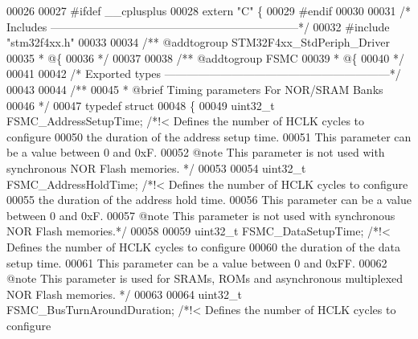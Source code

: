 \begin{DoxyCode}
00026 
00027 \textcolor{preprocessor}{#}\textcolor{preprocessor}{ifdef} \_\_cplusplus
00028  \textcolor{keyword}{extern} \textcolor{stringliteral}{"C"} \{
00029 \textcolor{preprocessor}{#}\textcolor{preprocessor}{endif}
00030 
00031 \textcolor{comment}{/* Includes ------------------------------------------------------------------*/}
00032 \textcolor{preprocessor}{#}\textcolor{preprocessor}{include} "stm32f4xx.h"
00033 
00034 \textcolor{comment}{/** @addtogroup STM32F4xx\_StdPeriph\_Driver}
00035 \textcolor{comment}{  * @\{}
00036 \textcolor{comment}{  */}
00037 
00038 \textcolor{comment}{/** @addtogroup FSMC}
00039 \textcolor{comment}{  * @\{}
00040 \textcolor{comment}{  */}
00041 
00042 \textcolor{comment}{/* Exported types ------------------------------------------------------------*/}
00043 
00044 \textcolor{comment}{/** }
00045 \textcolor{comment}{  * @brief  Timing parameters For NOR/SRAM Banks  }
00046 \textcolor{comment}{  */}
00047 \textcolor{keyword}{typedef} \textcolor{keyword}{struct}
00048 \{
00049   uint32\_t FSMC_AddressSetupTime;       \textcolor{comment}{/*!< Defines the number of HCLK cycles to configure}
00050 \textcolor{comment}{                                             the duration of the address setup time. }
00051 \textcolor{comment}{                                             This parameter can be a value between 0 and 0xF.}
00052 \textcolor{comment}{                                             @note This parameter is not used with synchronous NOR
       Flash memories. */}
00053 
00054   uint32\_t FSMC_AddressHoldTime;        \textcolor{comment}{/*!< Defines the number of HCLK cycles to configure}
00055 \textcolor{comment}{                                             the duration of the address hold time.}
00056 \textcolor{comment}{                                             This parameter can be a value between 0 and 0xF. }
00057 \textcolor{comment}{                                             @note This parameter is not used with synchronous NOR
       Flash memories.*/}
00058 
00059   uint32\_t FSMC_DataSetupTime;          \textcolor{comment}{/*!< Defines the number of HCLK cycles to configure}
00060 \textcolor{comment}{                                             the duration of the data setup time.}
00061 \textcolor{comment}{                                             This parameter can be a value between 0 and 0xFF.}
00062 \textcolor{comment}{                                             @note This parameter is used for SRAMs, ROMs and
       asynchronous multiplexed NOR Flash memories. */}
00063 
00064   uint32\_t FSMC_BusTurnAroundDuration;  \textcolor{comment}{/*!< Defines the number of HCLK cycles to configure}

\end{DoxyCode}
